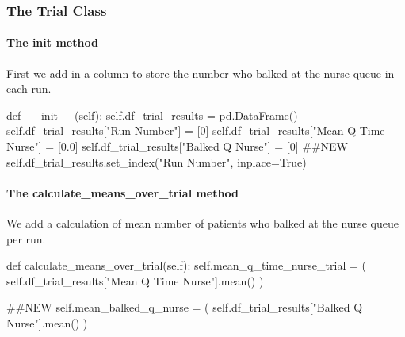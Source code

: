 \documentclass[
  letterpaper,
  DIV=11,
  numbers=noendperiod]{scrreprt}
\let\oldparagraph\paragraph
\renewcommand{\paragraph}[1]{\oldparagraph{#1}\mbox{}}
\newenvironment{Shaded}{}{}
\newcommand{\CommentTok}[1]{\textcolor[rgb]{0.42,0.45,0.49}{#1}}
\newcommand{\DecValTok}[1]{\textcolor[rgb]{0.00,0.36,0.77}{#1}}
\newcommand{\FloatTok}[1]{\textcolor[rgb]{0.00,0.36,0.77}{#1}}
\newcommand{\FunctionTok}[1]{\textcolor[rgb]{0.44,0.26,0.76}{#1}}
\newcommand{\KeywordTok}[1]{\textcolor[rgb]{0.84,0.23,0.29}{#1}}
\newcommand{\NormalTok}[1]{\textcolor[rgb]{0.14,0.16,0.18}{#1}}
\newcommand{\OperatorTok}[1]{\textcolor[rgb]{0.14,0.16,0.18}{#1}}
\newcommand{\StringTok}[1]{\textcolor[rgb]{0.01,0.18,0.38}{#1}}
\newcommand{\VariableTok}[1]{\textcolor[rgb]{0.89,0.38,0.04}{#1}}
\begin{document}
\subsubsection{The Trial Class}\label{the-trial-class-5}

\paragraph{\texorpdfstring{The \textbf{init}
method}{The init method}}\label{the-init-method-5}

First we add in a column to store the number who balked at the nurse
queue in each run.

\begin{Shaded}
\begin{Highlighting}[]
\KeywordTok{def}  \FunctionTok{\_\_init\_\_}\NormalTok{(}\VariableTok{self}\NormalTok{):}
    \VariableTok{self}\NormalTok{.df\_trial\_results }\OperatorTok{=}\NormalTok{ pd.DataFrame()}
    \VariableTok{self}\NormalTok{.df\_trial\_results[}\StringTok{"Run Number"}\NormalTok{] }\OperatorTok{=}\NormalTok{ [}\DecValTok{0}\NormalTok{]}
    \VariableTok{self}\NormalTok{.df\_trial\_results[}\StringTok{"Mean Q Time Nurse"}\NormalTok{] }\OperatorTok{=}\NormalTok{ [}\FloatTok{0.0}\NormalTok{]}
    \VariableTok{self}\NormalTok{.df\_trial\_results[}\StringTok{"Balked Q Nurse"}\NormalTok{] }\OperatorTok{=}\NormalTok{ [}\DecValTok{0}\NormalTok{] }\CommentTok{\#\#NEW}
    \VariableTok{self}\NormalTok{.df\_trial\_results.set\_index(}\StringTok{"Run Number"}\NormalTok{, inplace}\OperatorTok{=}\VariableTok{True}\NormalTok{)}
\end{Highlighting}
\end{Shaded}

\paragraph{The calculate\_means\_over\_trial
method}\label{the-calculate_means_over_trial-method-1}

We add a calculation of mean number of patients who balked at the nurse
queue per run.

\begin{Shaded}
\begin{Highlighting}[]
    \KeywordTok{def}\NormalTok{ calculate\_means\_over\_trial(}\VariableTok{self}\NormalTok{):}
        \VariableTok{self}\NormalTok{.mean\_q\_time\_nurse\_trial }\OperatorTok{=}\NormalTok{ (}
            \VariableTok{self}\NormalTok{.df\_trial\_results[}\StringTok{"Mean Q Time Nurse"}\NormalTok{].mean()}
\NormalTok{        )}

        \CommentTok{\#\#NEW}
        \VariableTok{self}\NormalTok{.mean\_balked\_q\_nurse }\OperatorTok{=}\NormalTok{ (}
            \VariableTok{self}\NormalTok{.df\_trial\_results[}\StringTok{"Balked Q Nurse"}\NormalTok{].mean()}
\NormalTok{        )}
\end{Highlighting}
\end{Shaded}
\end{document}

